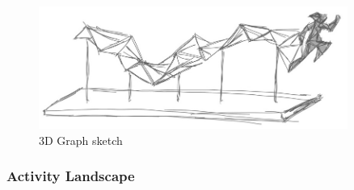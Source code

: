 \documentclass[../medieninformatik-arbeit.tex]{subfiles}
\begin{document}
\begin{figure}[h]
\captionsetup{width=0.9\textwidth}
\begin{center}
  \includegraphics[width=0.9\textwidth]{Prototype/img/3DGraph_detail}
  \caption{3D Graph sketch}
\label{fig:3DgraphDetail}
\end{center}
\end{figure}


\subsubsection{Activity Landscape}
\end{document}
